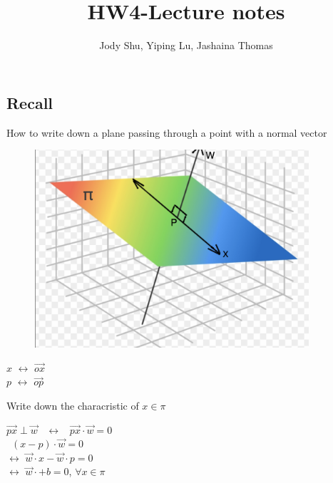 \documentclass[18pt, oneside]{article}
\title{HW4-Lecture notes}
\author{Jody Shu, Yiping Lu, Jashaina Thomas}
\begin{document}
\maketitle
\begin{Large}
\subsection*{Recall}
How to write down a plane passing through a point with a normal vector

\begin{figure}[htbp] %
   \centering
   \includegraphics[width=4in]{yyy.png} 
\end{figure}

\begin{center}
$x$ $\leftrightarrow$ $\vec{ox}$ \\
$p$ $\leftrightarrow$ $\vec{op}$ \\
\end{center}
Write down the characristic of $x \in \pi$  \
\begin{center} $\vec{px} \perp \vec{w}$ \
$\longleftrightarrow$ \ $\vec{px} \cdot \vec{w} = 0$ \\ 
\ $(x-p) \cdot \vec{w} = 0$ \\
$\longleftrightarrow$ $\vec{w} \cdot x - \vec{w} \cdot p = 0$ \\
$\longleftrightarrow$ $\vec{w} \cdot + b = 0$, $\forall x \in \pi$


\end{center}
\end{Large}
\end{document}
